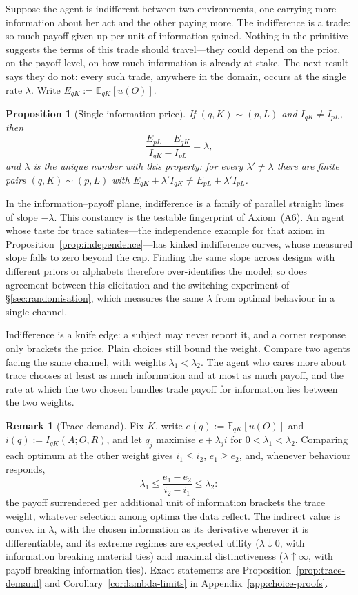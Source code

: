 \documentclass[11pt,a4paper]{article}
\newtheorem{proposition}[theorem]{Proposition}
\theoremstyle{definition}
\newtheorem{remark}[theorem]{Remark}
\newcommand{\E}{\mathbb E}
\newcommand{\I}{I}
\newcommand{\1}{\mathbf 1}
\begin{document}
Suppose the agent is indifferent between two environments, one carrying more information about her act and the
other paying more.  The indifference is a trade: so much payoff given up per unit of information gained.
Nothing in the primitive suggests the terms of this trade should travel---they could depend on the prior, on the
payoff level, on how much information is already at stake.  The next result says they do not: every such trade,
anywhere in the domain, occurs at the single rate $\lambda$.  Write $E_{qK}:=\E_{qK}[u(O)]$.

\begin{proposition}[Single information price]\label{prop:single-price}
If $(q,K)\sim(p,L)$ and $\I_{qK}\ne\I_{pL}$, then
\[
 \frac{E_{pL}-E_{qK}}{\I_{qK}-\I_{pL}}=\lambda,
\]
and $\lambda$ is the unique number with this property: for every $\lambda'\ne\lambda$ there are finite pairs
$(q,K)\sim(p,L)$ with $E_{qK}+\lambda'\I_{qK}\ne E_{pL}+\lambda'\I_{pL}$.
\end{proposition}

In the information--payoff plane, indifference is a family of
parallel straight lines of slope $-\lambda$.  This constancy is the testable fingerprint of
Axiom~\textup{(A6)}.  An agent whose taste for trace satiates---the independence example for that axiom in
Proposition~\ref{prop:independence}---has kinked indifference curves, whose measured slope falls to zero beyond
the cap.  Finding the same slope across designs with different priors or alphabets therefore over-identifies the
model; so does agreement between this elicitation and the switching experiment of \S\ref{sec:randomisation},
which measures the same $\lambda$ from optimal behaviour in a single channel.

Indifference is a knife edge: a subject may never report it, and a corner response only brackets the price.
Plain choices still bound the weight.  Compare two agents facing the same channel, with weights
$\lambda_1<\lambda_2$.  The agent who cares more about trace chooses at least as much information and at most as
much payoff, and the rate at which the two chosen bundles trade payoff for information lies between the two
weights.

\begin{remark}[Trace demand]\label{rem:trace-demand}
Fix $K$, write $e(q):=\E_{qK}[u(O)]$ and $i(q):=\I_{qK}(A;O,R)$, and let $q_j$ maximise $e+\lambda_ji$ for
$0<\lambda_1<\lambda_2$.  Comparing each optimum at the other weight gives $i_1\le i_2$, $e_1\ge e_2$, and,
whenever behaviour responds,
\[
 \lambda_1\le\frac{e_1-e_2}{i_2-i_1}\le\lambda_2:
\]
the payoff surrendered per additional unit of information brackets the trace weight, whatever selection among
optima the data reflect.  The indirect value is convex in $\lambda$, with the chosen information as its derivative
wherever it is differentiable, and its extreme regimes are expected utility ($\lambda\downarrow0$, with information
breaking material ties) and maximal distinctiveness ($\lambda\uparrow\infty$, with payoff breaking information
ties).  Exact statements are Proposition~\ref{prop:trace-demand} and Corollary~\ref{cor:lambda-limits} in
Appendix~\ref{app:choice-proofs}.
\end{remark}
\end{document}
